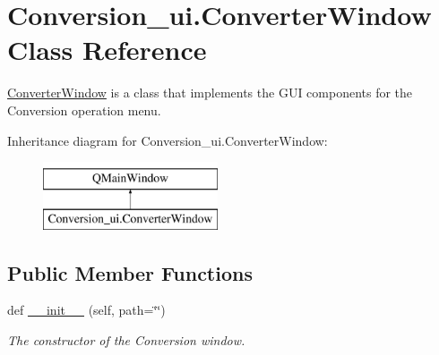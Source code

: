 \hypertarget{class_conversion__ui_1_1_converter_window}{}\section{Conversion\+\_\+ui.\+Converter\+Window Class Reference}
\label{class_conversion__ui_1_1_converter_window}


\hyperlink{class_conversion__ui_1_1_converter_window}{Converter\+Window} is a class that implements the G\+UI components for the Conversion operation menu.  


Inheritance diagram for Conversion\+\_\+ui.\+Converter\+Window\+:\begin{figure}[H]
\begin{center}
\leavevmode
\includegraphics[height=2.000000cm]{class_conversion__ui_1_1_converter_window}
\end{center}
\end{figure}
\subsection*{Public Member Functions}
\begin{DoxyCompactItemize}
\item 
def \hyperlink{class_conversion__ui_1_1_converter_window_a3ae25e516ec55570394c9a171301dd02}{\+\_\+\+\_\+init\+\_\+\+\_\+} (self, path=\char`\"{}\char`\"{})
\begin{DoxyCompactList}\small\item\em The constructor of the Conversion window. \end{DoxyCompactList}\end{DoxyCompactItemize}
